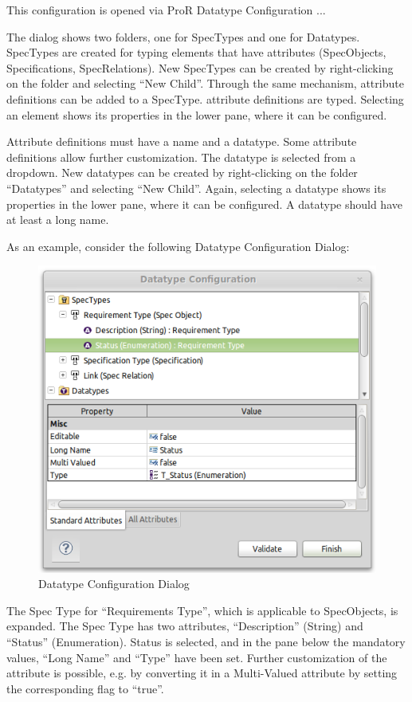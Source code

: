 This configuration is opened via ProR \textbar{} Datatype Configuration
...

The dialog shows two folders, one for SpecTypes and one for Datatypes.
SpecTypes are created for typing elements that have attributes
(SpecObjects, Specifications, SpecRelations).  New SpecTypes can be
created by right-clicking on the folder and selecting ``New Child''.
Through the same mechanism, attribute definitions can be added to a
SpecType.  attribute definitions are typed.  Selecting an element shows
its properties in the lower pane, where it can be configured.

Attribute definitions must have a name and a datatype.  Some attribute
definitions allow further customization.  The datatype is selected from a
dropdown.  New datatypes can be created by right-clicking on the folder
``Datatypes'' and selecting ``New Child''.  Again, selecting a datatype
shows its properties in the lower pane, where it can be configured.  A
datatype should have at least a long name.

As an example, consider the following Datatype Configuration Dialog:

\begin{figure}[h!]
\centering     
\includegraphics[width=0.8\linewidth]{../rmf-images/pror_datatype_configuration.png}
\caption{Datatype Configuration Dialog}      
\label{fig:DatatypeConfig}
\end{figure}

The Spec Type for ``Requirements Type'', which is applicable to
SpecObjects, is expanded.  The Spec Type has two attributes,
``Description'' (String) and ``Status'' (Enumeration).  Status is
selected, and in the pane below the mandatory values, ``Long Name'' and
``Type'' have been set.  Further customization of the attribute is
possible, e.g.  by converting it in a Multi-Valued attribute by setting
the corresponding flag to ``true''.

